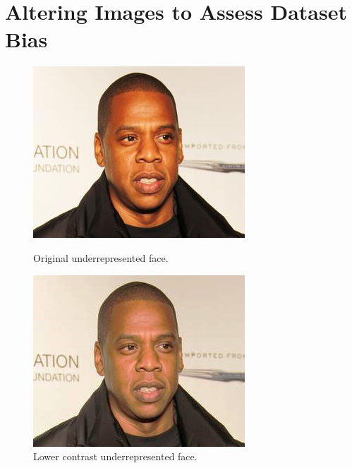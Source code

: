 \documentclass{l4proj}
\begin{document}
\section{Altering Images to Assess Dataset Bias}
\begin{figure}[h!]
  \centering
  \begin{minipage}{0.49\textwidth}
    \includegraphics[width=\textwidth]{images/4_nocontrast.jpg}
    \caption{Original underrepresented face.}
    \label{4_nocontrast}
  \end{minipage}
  \hfill
  \begin{minipage}{0.49\textwidth}
    \includegraphics[width=\textwidth]{images/4_contrast.jpg}
    \caption{Lower contrast underrepresented face.}
    \label{4_contrast}
  \end{minipage}
  \hfill
\end{figure}
\end{document}
